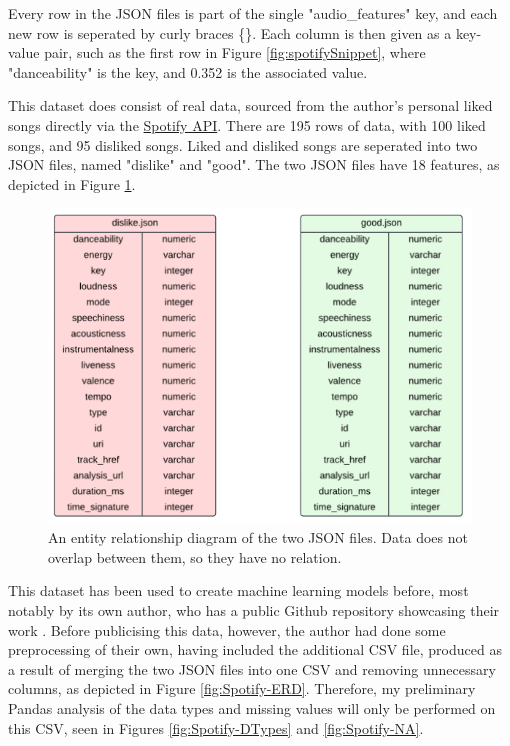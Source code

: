 \documentclass[12pt]{report}
\begin{document}
Every row in the JSON files is part of the single "audio\_features" key, and each new row is seperated by curly braces \{\}. Each column is then given as a 
key-value pair, such as the first row in Figure \ref{fig:spotifySnippet}, where "danceability" is the key, and 0.352 is the associated value.

\noindent This dataset does consist of real data, sourced from the author's personal liked songs directly via the 
\href{https://developer.spotify.com/documentation/web-api}{Spotify API}. There are 195 rows of data, with 100 liked songs, and 95 disliked songs.
Liked and disliked songs are seperated into two JSON files, named "dislike" and "good". The two JSON files have 18 features, as depicted in Figure 
\ref{fig:JSON-ERD}. 

\begin{figure}[H]
    \centering
    \includegraphics[width=.75\linewidth]{SpotifyJSON-ERD.png}
    \caption{An entity relationship diagram of the two JSON files. Data does not overlap between them, so they have no relation.}
    \label{fig:JSON-ERD}
\end{figure}

This dataset has been used to create machine learning models before, most notably by its own author, who has a public Github repository 
showcasing their work \autocite{brice-vergnou_brice-vergnouspotify_recommendation_2024}. 
Before publicising this data, however, the author had done some preprocessing of their own, having included the additional CSV file,
produced as a result of merging the two JSON files into one CSV and removing unnecessary columns, as depicted in Figure \ref{fig:Spotify-ERD}.
Therefore, my preliminary Pandas analysis of the data types and missing values will only be performed on this CSV, seen in Figures \ref{fig:Spotify-DTypes}
and \ref{fig:Spotify-NA}.
\end{document}
